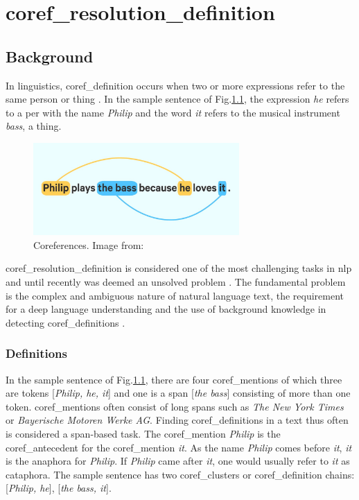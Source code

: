 \chapter{\gls{coref_resolution_definition}}\label{ch:coreference-resolution}


\section{Background}\label{sec:background}
In linguistics, \gls{coref_definition} occurs when two or more expressions refer to the same person or thing \cite{Coreference}.
In the sample sentence of Fig.\ref{fig:coreferences}, the expression \emph{he} refers to a \gls{per} with the name \emph{Philip} and the word \emph{it} refers to the musical instrument \emph{bass}, a thing.

\begin{figure}[H]   %
    \centering
    \includegraphics[width=0.7\textwidth]{Assets/spacycorefpic}
    \caption{Coreferences. Image from: \cite{spacy}}
    \label{fig:coreferences}
\end{figure}

\gls{coref_resolution_definition} is considered one of the most challenging tasks in \gls{nlp} and until recently was deemed an unsolved problem \cite{CorefResIsHard}.
The fundamental problem is the complex and ambiguous nature of natural language text, the requirement for a deep language understanding and the use of background knowledge in detecting \glspl{coref_definition} \cite{CorefResIsHard}.


\subsection{Definitions}\label{subsec:definitions}
In the sample sentence of Fig.\ref{fig:coreferences}, there are four \glspl{coref_mention} of which three are \glspl{token} [\emph{Philip, he, it}] and one is a \gls{span} [\emph{the bass}] consisting of more than one \gls{token}.
\glspl{coref_mention} often consist of long \glspl{span} such as \emph{The New York Times} or \emph{Bayerische Motoren Werke AG}.
Finding \glspl{coref_definition} in a text thus often is considered a \gls{span}-based task.
The \gls{coref_mention} \emph{Philip} is the \gls{coref_antecedent} for the \gls{coref_mention} \emph{it}.
As the name \emph{Philip} comes before \emph{it}, \emph{it} is the \gls{anaphora} for \emph{Philip}.
If \emph{Philip} came after \emph{it}, one would usually refer to \emph{it} as \gls{cataphora}.
The sample sentence has two \glspl{coref_cluster} or \gls{coref_definition} chains: [\emph{Philip, he}], [\emph{the bass, it}].

